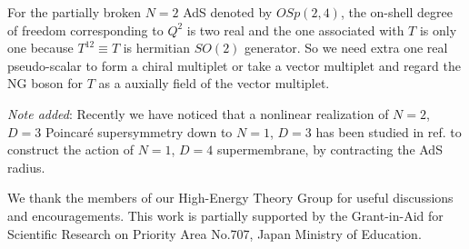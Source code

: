 \documentclass[a4paper,12pt]{article}
\begin{document}
For the partially broken $N=2$ AdS denoted by $OSp(2,4)$, 
the on-shell degree of freedom corresponding to 
$Q^2$ is two real and the one associated with $T$ is only one because $T^{12}
\equiv T$
is hermitian $SO(2)$ generator. So we need extra one real pseudo-scalar to form
a chiral multiplet or take a vector multiplet and regard the NG boson for $T$
as a auxially field of the vector multiplet. 

\vspace{0.3cm}

{\it Note added}: Recently we have noticed that a nonlinear realization of
$N=2$, $D=3$ Poincar{\'e} supersymmetry down to $N=1$, $D=3$ has been
studied in ref.\cite{EK} to construct the action of $N=1$, $D=4$ 
supermembrane, by contracting the AdS radius. 


\newpage
\vspace{0.3cm}
\vspace{0.3cm}
We thank the members of our High-Energy Theory Group for useful discussions
and encouragements. This work is partially supported by the Grant-in-Aid
for Scientific Research on Priority Area No.707, Japan Ministry of Education.
 

\vspace{1cm}
\end{document}

